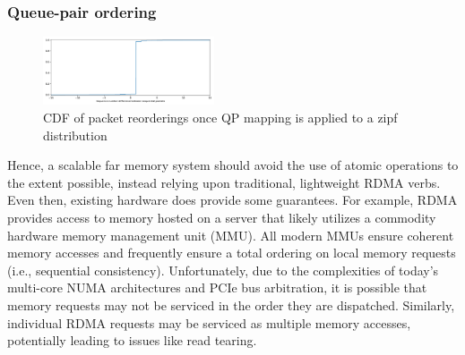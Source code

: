 


\subsubsection{Queue-pair ordering}

\begin{figure}[t]
    \includegraphics[width=0.45\textwidth]{fig/qp_reordering.pdf}
    \caption{CDF of packet reorderings once QP mapping is applied to a zipf distribution}
    \label{fig:reorder}
\end{figure}

Hence, a scalable far memory system should avoid the use of atomic
operations to the extent possible, instead relying upon traditional,
lightweight RDMA verbs.  Even then, existing hardware does provide
some guarantees.  For example, RDMA provides access to memory hosted
on a server that likely utilizes a commodity hardware memory
management unit (MMU).  All modern MMUs ensure coherent memory
accesses and frequently ensure a total ordering on local memory
requests (i.e., sequential consistency).  Unfortunately, due to the
complexities of today's multi-core NUMA architectures and PCIe bus
arbitration, it is possible that memory requests may not be serviced
in the order they are dispatched.  Similarly, individual RDMA requests
may be serviced as multiple memory accesses, potentially leading to
issues like read tearing.

